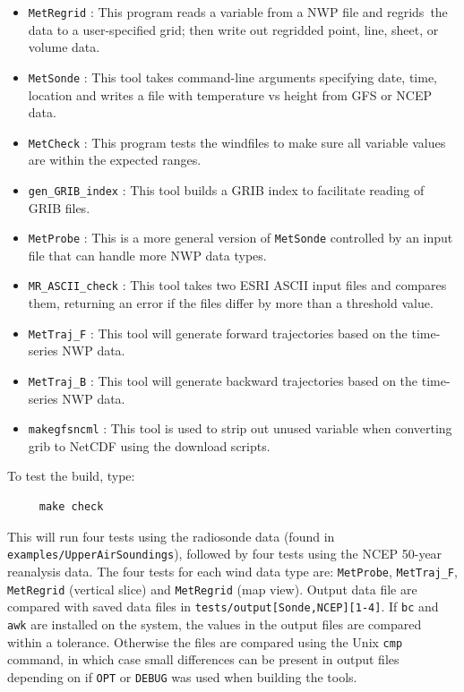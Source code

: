 \documentclass[11pt]{article}   %
\begin{document}
\begin{itemize}
\item \texttt{MetRegrid} : This program reads a variable from a NWP file and regrids\
the data to a user-specified grid; then write out regridded point, line, sheet, or volume data.
\item \texttt{MetSonde} : This tool takes command-line arguments specifying date, time, location
and writes a file with temperature vs height from GFS or NCEP data.
\item \texttt{MetCheck} : This program tests the windfiles to make sure all variable values
are within the expected ranges.
\item \texttt{gen\_GRIB\_index} : This tool builds a GRIB index to facilitate reading of GRIB
files.
\item \texttt{MetProbe} : This is a more general version of \texttt{MetSonde} controlled by
an input file that can handle more NWP data types.
\item \texttt{MR\_ASCII\_check} : This tool takes two ESRI ASCII input files and compares them,
returning an error if the files differ by more than a threshold value.
\item \texttt{MetTraj\_F} : This tool will generate forward trajectories based on the
time-series NWP data.
\item \texttt{MetTraj\_B} : This tool will generate backward trajectories based on the
time-series NWP data.
\item \texttt{makegfsncml} :  This tool is used to strip out unused variable when converting
grib to NetCDF using the download scripts.
\end{itemize}

To test the build, type:
\begin{verbatim}
     make check
\end{verbatim}
This will run four tests using the radiosonde data (found in \texttt{examples/UpperAirSoundings}),
followed by four tests using the NCEP 50-year reanalysis data.  The four tests for
each wind data type are: \texttt{MetProbe}, \texttt{MetTraj\_F}, \texttt{MetRegrid} (vertical slice)
and  \texttt{MetRegrid} (map view).
Output data file are compared with saved data files in \texttt{tests/output[Sonde,NCEP][1-4]}.
If \texttt{bc} and \texttt{awk} are installed on the system, the values in the output files are
compared within a tolerance.  Otherwise the files are compared
using the Unix \texttt{cmp} command, in which case small differences
can be present in output files depending on if \texttt{OPT} or \texttt{DEBUG} was used
when building the tools.
\end{document}
